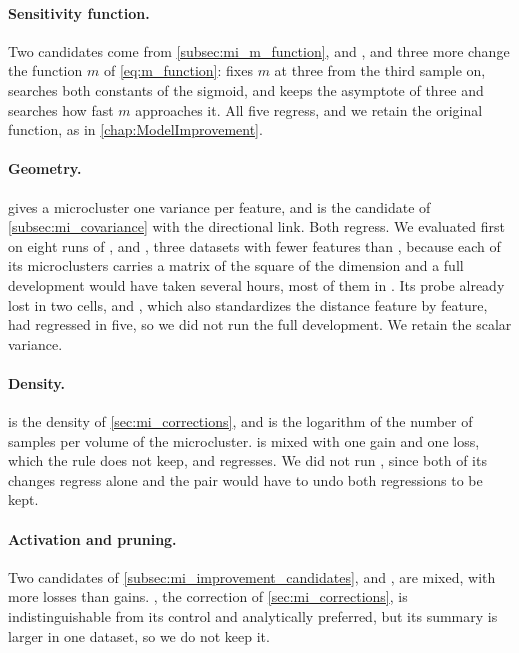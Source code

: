 

\paragraph{Sensitivity function.} Two candidates come from \cref{subsec:mi_m_function},  and , and three more change the function $m$ of \cref{eq:m_function}:  fixes $m$ at three from the third sample on,  searches both constants of the sigmoid, and  keeps the asymptote of three and searches how fast $m$ approaches it. All five regress, and we retain the original function, as in \cref{chap:ModelImprovement}.

\paragraph{Geometry.}  gives a microcluster one variance per feature, and  is the candidate of \cref{subsec:mi_covariance} with the directional link. Both regress. We evaluated  first on eight runs of \InsectsIncremental, \Pendigits and \Shuttle, three datasets with fewer features than \GasDrift, because each of its microclusters carries a matrix of the square of the dimension and a full development would have taken several hours, most of them in \GasDrift. Its probe already lost in two cells, and , which also standardizes the distance feature by feature, had regressed in five, so we did not run the full development. We retain the scalar variance.

\paragraph{Density.}  is the density of \cref{sec:mi_corrections}, and  is the logarithm of the number of samples per volume of the microcluster.  is mixed with one gain and one loss, which the rule does not keep, and  regresses. We did not run , since both of its changes regress alone and the pair would have to undo both regressions to be kept.

\paragraph{Activation and pruning.} Two candidates of \cref{subsec:mi_improvement_candidates},  and , are mixed, with more losses than gains. , the correction of \cref{sec:mi_corrections}, is indistinguishable from its control and analytically preferred, but its summary is larger in one dataset, so we do not keep it.

